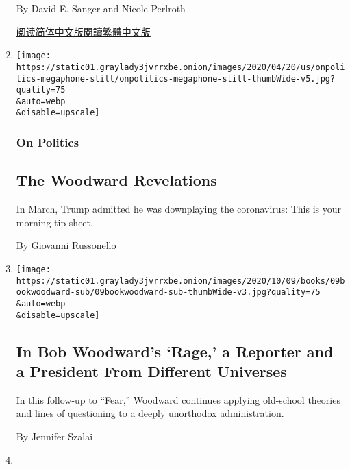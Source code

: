 \begin{enumerate}
  By David E. Sanger and Nicole Perlroth

  \href{https://cn.nytimes3xbfgragh.onion/usa/20200911/microsoft-election-hacking/}{阅读简体中文版}\href{https://cn.nytimes3xbfgragh.onion/usa/20200911/microsoft-election-hacking/zh-hant/}{閱讀繁體中文版}
\item
  \href{/2020/09/10/us/politics/trump-woodward-book.html}{}

  \texttt{[image: https://static01.graylady3jvrrxbe.onion/images/2020/04/20/us/onpolitics-megaphone-still/onpolitics-megaphone-still-thumbWide-v5.jpg?quality=75\\\&auto=webp\\\&disable=upscale]}

  \hypertarget{on-politics}{%
  \subsubsection{On Politics}\label{on-politics}}

  \hypertarget{the-woodward-revelations}{%
  \subsection{The Woodward Revelations}\label{the-woodward-revelations}}

  In March, Trump admitted he was downplaying the coronavirus: This is
  your morning tip sheet.

  By Giovanni Russonello
\item
  \href{/2020/09/09/books/review-rage-donald-trump-bob-woodward.html}{}

  \texttt{[image: https://static01.graylady3jvrrxbe.onion/images/2020/10/09/books/09bookwoodward-sub/09bookwoodward-sub-thumbWide-v3.jpg?quality=75\\\&auto=webp\\\&disable=upscale]}

  \hypertarget{in-bob-woodwards-rage-a-reporter-and-a-president-from-different-universes}{%
  \subsection{In Bob Woodward's `Rage,' a Reporter and a President From
  Different
  Universes}\label{in-bob-woodwards-rage-a-reporter-and-a-president-from-different-universes}}

  In this follow-up to ``Fear,'' Woodward continues applying old-school
  theories and lines of questioning to a deeply unorthodox
  administration.

  By Jennifer Szalai
\item
  \href{/video/us/politics/100000007332233/trump-supreme-court-list.html}{}


\end{enumerate}
